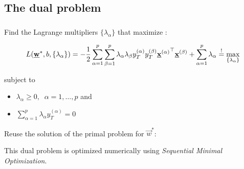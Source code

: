 \subsection{The dual problem}

\begin{frame}\frametitle{\subsecname}

Find the Lagrange multipliers $\{\lambda_{\alpha}\}$ that maximize \notesonly{\eqref{eq:lagrangiandual}}:

\begin{equation*}
L(\underline{\mathbf{w}}^*, b, \{\lambda_{\alpha}\})
= -\frac{1}{2} 
\sum_{\alpha=1}^{p} \sum_{\beta=1}^{p} 
\lambda_{\alpha} \lambda_{\beta} 
y_{T}^{(\alpha)} y_{T}^{(\beta)}
{\underline{\mathbf{x}}^{(\alpha)}}^\top  \underline{\mathbf{x}}^{(\beta)}
+ \sum_{\alpha=1}^{p} \lambda_{\alpha}
 \stackrel{\mathrm{!}}{=} \max_{\{\lambda_\alpha\}}
\end{equation*}

subject to 
\begin{itemize}
\item[] $\lambda_\alpha \ge 0,\;\; \alpha = 1,\ldots,p$ and
\item[]$\sum_{\alpha=1}^{p} \lambda_{\alpha} y_{T}^{(\alpha)} = 0$
\end{itemize}

Reuse the solution of the primal problem for $\vec w^*$:

This dual problem is optimized numerically using \emph{Sequential Minimal Optimization}.


\end{frame}

